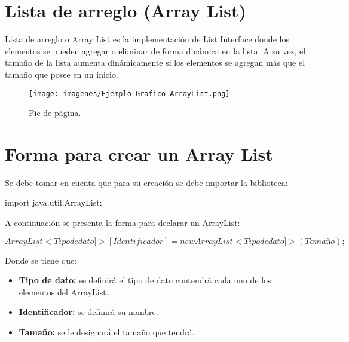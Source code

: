 \documentclass[12pt, letterpaper]{article} %
\begin{document}
\section*{Lista de arreglo (Array List)}
Lista de arreglo o Array List es la implementación de List Interface donde los elementos se pueden agregar o eliminar de forma dinámica en la lista. A su vez, el tamaño de la lista aumenta dinámicamente si los elementos se agregan más que el tamaño que posee en un inicio.

\begin{figure}[h]
    \centering
    \texttt{[image: imagenes/Ejemplo Grafico ArrayList.png]}
    \caption{Pie de página.}
    \label{fig:ejemploarraylist}
\end{figure}

\section*{Forma para crear un Array List}
Se debe tomar en cuenta que para su creación se debe importar la biblioteca:

\begin{center}
    import java.util.ArrayList;
\end{center}

A continuación se presenta la forma para declarar un ArrayList:
\begin{center}
    \(ArrayList<Tipo de dato]> [Identificador] = new ArrayList<Tipo de dato]>(Tamaño);\)
\end{center}

Donde se tiene que:
\begin{itemize}
    \item \textbf{Tipo de dato:} se definirá el tipo de dato contendrá cada uno de los elementos del ArrayList.
    \item \textbf{Identificador:} se definirá su nombre.
    \item \textbf{Tamaño:} se le designará el tamaño que tendrá.
\end{itemize}
\end{document}
